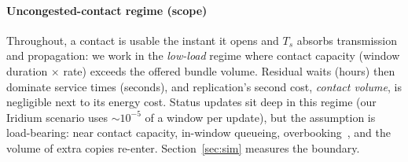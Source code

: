 \documentclass[twocolumn,3p,times,procedia]{elsarticle}
\theoremstyle{plain}
\theoremstyle{remark}
\begin{document}
\paragraph*{Uncongested-contact regime (scope)}
Throughout, a contact is usable the instant it opens and $T_s$ absorbs
transmission and propagation: we work in the \emph{low-load} regime
where contact capacity (window duration $\times$ rate) exceeds the
offered bundle volume. Residual waits (hours) then dominate service
times (seconds), and replication's second cost, \emph{contact volume},
is negligible next to its energy cost. Status updates sit deep in this
regime (our Iridium scenario uses ${\sim}10^{-5}$ of a window per
update), but the assumption is load-bearing: near contact capacity,
in-window queueing, overbooking~\cite{bezirgiannidis}, and the volume
of extra copies re-enter. Section~\ref{sec:sim} measures the boundary.
\end{document}
